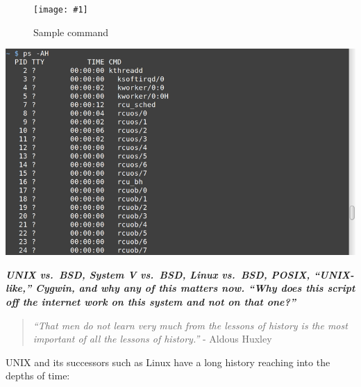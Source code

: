 \documentclass[10pt,]{book}
\numberwithin{figure}{chapter}
\DeclareRobustCommand{\fimg}[3]{
\ifxetex
\begin{figure}[H]
\texttt{[image: \#1]}
\caption{#2}
\label{fig:#3}
\end{figure}
\fi}
\begin{document}
\ifxetex\fimg{./images/ps-AH.png}{Sample command}{ps-AH} \else
\includegraphics{./images/ps-AH.png} \fi


\textbf{\emph{UNIX vs.~BSD, System V vs.~BSD, Linux vs.~BSD, POSIX,
``UNIX-like,'' Cygwin, and why any of this matters now. ``Why does this
script off the internet work on this system and not on that one?''}}

\begin{quote}
\emph{``That men do not learn very much from the lessons of history is
the most important of all the lessons of history.''} - Aldous Huxley
\end{quote}

UNIX and its successors such as Linux have a long history reaching into
the depths of time:
\end{document}
